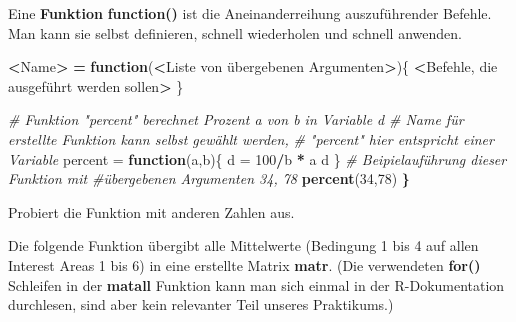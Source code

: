 \documentclass[]{book}
\newenvironment{Shaded}{\begin{snugshade}}{\end{snugshade}}
\newcommand{\KeywordTok}[1]{\textcolor[rgb]{0.13,0.29,0.53}{\textbf{#1}}}
\newcommand{\DecValTok}[1]{\textcolor[rgb]{0.00,0.00,0.81}{#1}}
\newcommand{\StringTok}[1]{\textcolor[rgb]{0.31,0.60,0.02}{#1}}
\newcommand{\CommentTok}[1]{\textcolor[rgb]{0.56,0.35,0.01}{\textit{#1}}}
\newcommand{\ControlFlowTok}[1]{\textcolor[rgb]{0.13,0.29,0.53}{\textbf{#1}}}
\newcommand{\OperatorTok}[1]{\textcolor[rgb]{0.81,0.36,0.00}{\textbf{#1}}}
\newcommand{\ErrorTok}[1]{\textcolor[rgb]{0.64,0.00,0.00}{\textbf{#1}}}
\newcommand{\NormalTok}[1]{#1}
\begin{document}
Eine \textbf{Funktion} \textbf{function()} ist die Aneinanderreihung
auszuführender Befehle. Man kann sie selbst definieren, schnell
wiederholen und schnell anwenden.

\begin{Shaded}
\begin{Highlighting}[]
\OperatorTok{<}\NormalTok{Name}\OperatorTok{>}\StringTok{ }\ErrorTok{=}\StringTok{ }\ControlFlowTok{function}\NormalTok{(}\OperatorTok{<}\NormalTok{Liste von übergebenen Argumenten}\OperatorTok{>}\NormalTok{)\{}
  \OperatorTok{<}\NormalTok{Befehle, die ausgeführt werden sollen}\OperatorTok{>}
\NormalTok{\}}


\CommentTok{# Funktion "percent" berechnet Prozent a von b in Variable d}
\CommentTok{# Name für erstellte Funktion kann selbst gewählt werden, }
\CommentTok{# "percent" hier entspricht einer Variable}
\NormalTok{percent =}\StringTok{ }\ControlFlowTok{function}\NormalTok{(a,b)\{ }
\NormalTok{    d =}\StringTok{ }\DecValTok{100}\OperatorTok{/}\NormalTok{b }\OperatorTok{*}\StringTok{ }\NormalTok{a}
\NormalTok{    d}
\NormalTok{\}}
\CommentTok{# Beipielauführung dieser Funktion mit }
\CommentTok{#übergebenen Argumenten 34, 78}
\KeywordTok{percent}\NormalTok{(}\DecValTok{34}\NormalTok{,}\DecValTok{78}\NormalTok{)}
\ErrorTok{\}}
\end{Highlighting}
\end{Shaded}

Probiert die Funktion mit anderen Zahlen aus.

Die folgende Funktion übergibt alle Mittelwerte (Bedingung 1 bis 4 auf
allen Interest Areas 1 bis 6) in eine erstellte Matrix \textbf{matr}.
(Die verwendeten \textbf{for()} Schleifen in der \textbf{matall}
Funktion kann man sich einmal in der R-Dokumentation durchlesen, sind
aber kein relevanter Teil unseres Praktikums.)
\end{document}
